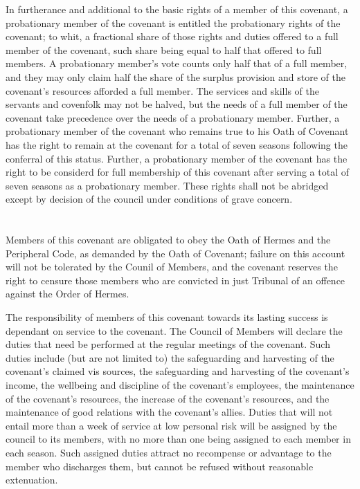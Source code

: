 \documentclass [a4paper,portrait]{article}
\begin{document}
\begin{multicols}{2}
\begin{small}
	In furtherance and additional to the basic rights of a member of this covenant, a probationary member
	of the covenant is entitled the probationary rights of the covenant; to whit, a fractional share of
	those rights and duties offered to a full member of the covenant, such share being equal to half that
	offered to full members. A probationary member's vote counts only half that of a full member, and they
	may only claim half the share of the surplus provision and store of the covenant's resources afforded a
	full member. The services and skills of the servants and covenfolk may not be halved, but the needs of a
	full member of the covenant take precedence over the needs of a probationary member. Further, a
	probationary member of the covenant who remains true to his Oath of Covenant has the right to remain at
	the covenant for a total of seven seasons following the conferral of this status. Further, a
	probationary member of the covenant has the right to be considerd for full membership of this covenant
	after serving a total of seven seasons as a probationary member. These rights shall not be abridged
	except by decision of the council under conditions of grave concern.
	
\section*{\fontsize{30}{35}\selectfont{Responsibilities of the Members of this Covenant}}
	Members of this covenant are obligated to obey the Oath of Hermes and the Peripheral Code, as demanded
	by the Oath of Covenant; failure on this account will not be tolerated by the Counil of Members, and the
	covenant reserves the right to censure those members who are convicted in just Tribunal of an offence
	against the Order of Hermes.
	
	The responsibility of members of this covenant towards its lasting success is dependant on service to
	the covenant. The Council of Members will declare the duties that need be performed at the regular
	meetings of the covenant. Such duties include (but are not limited to) the safeguarding and harvesting
	of the covenant's claimed vis sources, the safeguarding and harvesting of the covenant's income, the
	wellbeing and discipline of the covenant's employees, the maintenance of the covenant's resources, the
	increase of the covenant's resources, and the maintenance of good relations with the covenant's allies.
	Duties that will not entail more than a week of service at low personal risk will be assigned by the
	council to its members, with no more than one being assigned to each member in each season. Such
	assigned duties attract no recompense or advantage to the member who discharges them, but cannot be
	refused without reasonable extenuation.
	

\end{small}
\end{multicols}
\end{document}
